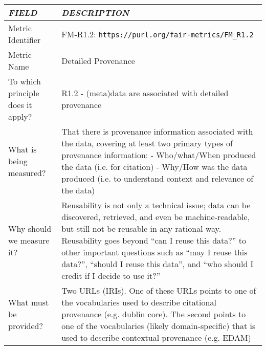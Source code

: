 \documentclass[english]{article}
\begin{document}
\begin{longtable}{|p{5cm}|p{9cm}|}


\hline
\emph{FIELD} & \emph{DESCRIPTION} \\
\hline
Metric Identifier &   FM-R1.2: \verb"https://purl.org/fair-metrics/FM_R1.2"
\\


\hline
Metric Name &   


Detailed Provenance


 \\



\hline
To which principle does it apply? &   


R1.2 - (meta)data are associated with detailed provenance

\\



\hline
What is being measured? & 


That there is provenance information associated with the data, covering at least two primary types of provenance information:\newline 
\newline 
- Who/what/When produced the data (i.e. for citation)\newline 
- Why/How was the data produced (i.e. to understand context and relevance of the data)

\\



\hline
Why should we measure it? & 


Reusability is not only a technical issue; data can be discovered, retrieved, and even be machine-readable, but still not be reusable in any rational way.  Reusability goes beyond “can I reuse this data?” to other important questions such as “may I reuse this data?”, “should I reuse this data”, and “who should I credit if I decide to use it?”


  
\\



\hline
What must be provided? &  


Two URLs (IRIs).  One of these URLs points to one of the vocabularies used to describe citational provenance (e.g. dublin core).  The second points to one of the vocabularies (likely domain-specific) that is used to describe contextual provenance (e.g. EDAM)



\end{longtable}
\end{document}
